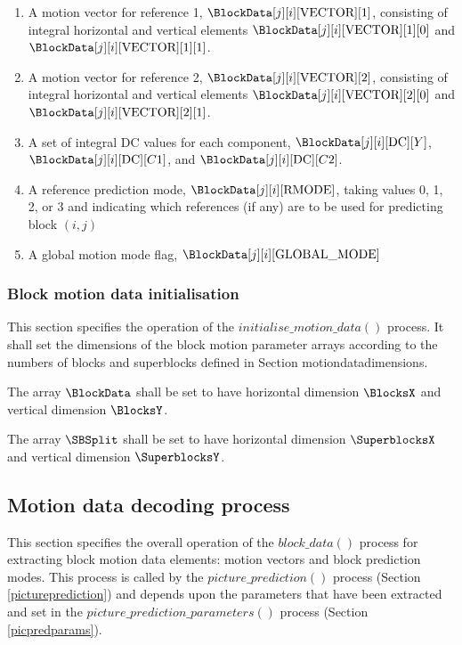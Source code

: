 \begin{enumerate}
\item A motion vector for reference 1, $\BlockData[j][i][\Vect][1]$, consisting of 
integral horizontal and vertical elements $\BlockData[j][i][\Vect][1][0]$ and 
$\BlockData[j][i][\Vect][1][1]$.
\item A motion vector for reference 2, $\BlockData[j][i][\Vect][2]$, consisting of 
integral horizontal and vertical elements $\BlockData[j][i][\Vect][2][0]$ and 
$\BlockData[j][i][\Vect][2][1]$.
\item A set of integral DC values for each component, $\BlockData[j][i][\DC][Y]$,
 $\BlockData[j][i][\DC][C1]$, and $\BlockData[j][i][\DC][C2]$.
\item A reference prediction mode, $\BlockData[j][i][\RMode]$, taking values 0, 1, 2, 
or 3 and indicating which references (if any) are to be used for predicting block $(i,j)$
\item A global motion mode flag, $\BlockData[j][i][\GMode]$
\end{enumerate}

\subsubsection{Block motion data initialisation}

\label{motioninit}

This section specifies the operation of the $initialise\_motion\_data()$ process.
 It shall set the dimensions of the block motion parameter arrays according to the numbers
of blocks and superblocks defined in Section {motiondatadimensions}.

The array $\BlockData$ shall be set to have horizontal dimension $\BlocksX$ and 
vertical dimension $\BlocksY$.

The array $\SBSplit$ shall be set to have horizontal dimension $\SuperblocksX$ 
and vertical dimension $\SuperblocksY$.

\subsection{Motion data decoding process}

This section specifies the overall operation of the $block\_data()$ process for extracting
block motion data elements: motion vectors and block prediction modes. This 
process is called by the $picture\_prediction()$ process (Section \ref{pictureprediction}) and
depends upon the parameters that have been extracted and set in the
$picture\_prediction\_parameters()$ process (Section \ref{picpredparams}).

